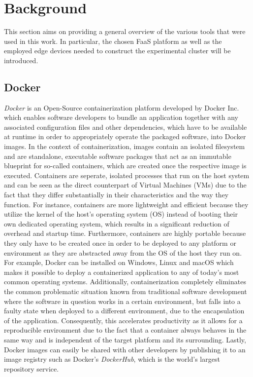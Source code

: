 \chapter{Background}\label{chapter:background}

This section aims on providing a general overview of the various tools that were used in this work. In particular, the chosen FaaS platform as well as the employed edge devices needed to construct the experimental cluster will be introduced.

\section{Docker}
\textit{Docker} is an Open-Source containerization platform developed by Docker Inc. which enables software developers to bundle an application together with any associated configuration files and other dependencies, which have to be available at runtime in order to appropriately operate the packaged software, into Docker images. In the context of containerization, images contain an isolated filesystem and are standalone, executable software packages that act as an immutable blueprint for so-called containers, which are created once the respective image is executed. Containers are seperate, isolated processes that run on the host system and can be seen as the direct counterpart of Virtual Machines (VMs) due to the fact that they differ substantially in their characteristics and the way they function. For instance, containers are more lightweight and efficient because they utilize the kernel of the host's operating system (OS) instead of booting their own dedicated operating system, which results in a significant reduction of overhead and startup time. Furthermore, containers are highly portable because they only have to be created once in order to be deployed to any platform or environment as they are abstracted away from the OS of the host they run on. For example, Docker can be installed on Windows, Linux and macOS which makes it possible to deploy a containerized application to any of today's most common operating systems. Additionally, containerization completely eliminates the common problematic situation known from traditional software development where the software in question works in a certain environment, but falls into a faulty state when deployed to a different environment, due to the encapsulation of the application. Consequently, this accelerates productivity as it allows for a reproducible environment due to the fact that a container always behaves in the same way and is independent of the target platform and its surrounding. Lastly, Docker images can easily be shared with other developers by publishing it to an image registry such as Docker's \textit{DockerHub}, which is the world's largest repository service. 

